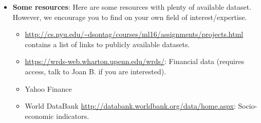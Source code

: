 \documentclass[11pt]{article}
\begin{document}
\begin{itemize}
\item \textbf{Some resources}: Here are some resources with plenty of available dataset. However, we encourage you to find on your own field of interest/expertise. 
\begin{itemize}
\item \url{http://cs.nyu.edu/~dsontag/courses/ml16/assignments/projects.html} contains a list of links to publicly available datasets.
\item \url{https://wrds-web.wharton.upenn.edu/wrds/}: Financial data (requires access, talk to Joan B. if you are interested).
\item Yahoo Finance
\item World DataBank \url{http://databank.worldbank.org/data/home.aspx}: Socio-economic indicators. 
\end{itemize}
\end{itemize}
\end{document}
